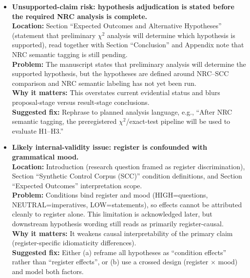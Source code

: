 \documentclass[11pt]{article}
\begin{document}
\begin{itemize}

\item \textbf{Unsupported-claim risk: hypothesis adjudication is stated before the required NRC analysis is complete.}\\
\textbf{Location:} Section ``Expected Outcomes and Alternative Hypotheses'' (statement that preliminary \(\chi^2\) analysis will determine which hypothesis is supported), read together with Section ``Conclusion'' and Appendix note that NRC semantic tagging is still pending.\\
\textbf{Problem:} The manuscript states that preliminary analysis will determine the supported hypothesis, but the hypotheses are defined around NRC--SCC comparison and NRC semantic labeling has not yet been run.\\
\textbf{Why it matters:} This overstates current evidential status and blurs proposal-stage versus result-stage conclusions.\\
\textbf{Suggested fix:} Rephrase to planned analysis language, e.g., ``After NRC semantic tagging, the preregistered \(\chi^2\)/exact-test pipeline will be used to evaluate H1--H3.''

\item \textbf{Likely internal-validity issue: register is confounded with grammatical mood.}\\
\textbf{Location:} Introduction (research question framed as register discrimination), Section ``Synthetic Control Corpus (SCC)'' condition definitions, and Section ``Expected Outcomes'' interpretation scope.\\
\textbf{Problem:} Conditions bind register and mood (HIGH=questions, NEUTRAL=imperatives, LOW=statements), so effects cannot be attributed cleanly to register alone. This limitation is acknowledged later, but downstream hypothesis wording still reads as primarily register-causal.\\
\textbf{Why it matters:} It weakens causal interpretability of the primary claim (register-specific idiomaticity differences).\\
\textbf{Suggested fix:} Either (a) reframe all hypotheses as ``condition effects'' rather than ``register effects'', or (b) use a crossed design (register \(\times\) mood) and model both factors.


\end{itemize}
\end{document}
